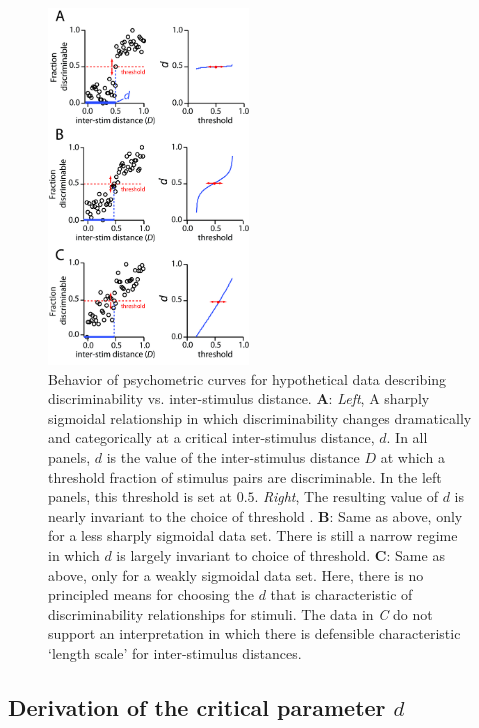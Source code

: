 \documentclass[letterpaper,twocolumn,10pt]{article}
\begin{document}
\begin{figure}[!hbt]
    \centering
    \includegraphics[width=0.475\textwidth]{figures/Fig5_Sigmoids}
    \caption{
Behavior of psychometric curves for hypothetical data describing discriminability vs. inter-stimulus distance. 
\textbf{A}: \textit{Left}, A sharply sigmoidal relationship in which 
discriminability changes dramatically and categorically at a critical inter-stimulus distance, $d$. In all panels, $d$ is the value of the inter-stimulus distance $D$ at which a threshold fraction of stimulus pairs are discriminable.  In the left panels, this threshold is set at $0.5$.
\textit{Right}, The resulting value of $d$ is nearly invariant to the choice of threshold . 
\textbf{B}: Same as above, only for a less sharply sigmoidal data set. 
There is still a narrow regime in which $d$ is largely invariant to choice of threshold. 
\textbf{C}: Same as above, only for a weakly sigmoidal data set. 
Here, there is no principled means for choosing the $d$ that is characteristic of discriminability relationships for stimuli. 
The data in \textit{C} do not support an interpretation in which 
there is defensible characteristic `length scale' for inter-stimulus distances.}
    \label{fig:sigmoids}
\end{figure}

\subsection{Derivation of the critical parameter $d$} 
\label{sec:derivation}
\end{document}
